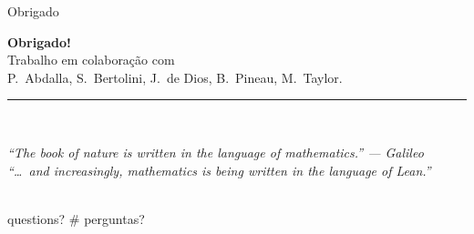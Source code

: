 \documentclass[10pt,aspectratio=169]{beamer}
\begin{document}
\begin{frame}[plain]{Obrigado}
  \vspace{0.4em}
  \begin{center}
    {\Large\bfseries\color{fgmain} Obrigado!}\\[1em]
    {\color{fgmute} Trabalho em colaboração com}\\[0.3em]
    {P.~Abdalla, S.~Bertolini, J.~de Dios, B.~Pineau, M.~Taylor.}\\[1.5em]
    {\color{accent}\rule{0.3\linewidth}{0.4pt}}\\[1em]
    \begin{minipage}{0.8\linewidth}
      \itshape\small\color{fgmute}
      ``The book of nature is written in the language of mathematics.''
      --- Galileo\\[0.5em]
      \itshape\small\color{fgmute}
      ``\ldots\ and increasingly, mathematics is being written in the
      language of Lean.''
    \end{minipage}\\[1.5em]
    {\ttfamily\small\color{accent} questions?}\quad
    {\ttfamily\small\color{fgmute} \# perguntas?}
  \end{center}
\end{frame}
\end{document}
